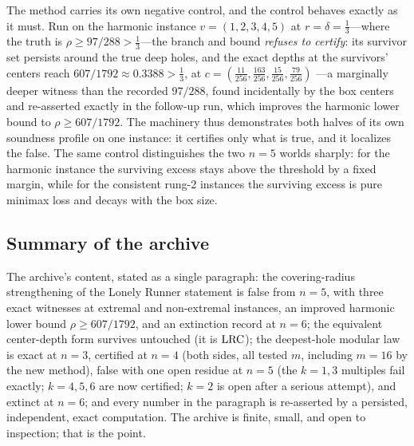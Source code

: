 The method carries its own negative control, and the control behaves
exactly as it must. Run on the harmonic instance $v=(1,2,3,4,5)$ at
$r=\delta=\tfrac13$---where the truth is $\rho\ge97/288>\tfrac13$---the
branch and bound \emph{refuses to certify}: its survivor set persists
around the true deep holes, and the exact depths at the survivors'
centers reach $607/1792\approx0.3388>\tfrac13$, at
$c=(\tfrac{11}{256},\tfrac{163}{256},\tfrac{15}{256},\tfrac{79}{256})$
---a marginally deeper witness than the recorded $97/288$, found
incidentally by the box centers and re-asserted exactly in the follow-up
run, which improves the harmonic lower bound to $\rho\ge607/1792$. The machinery thus demonstrates both halves of its own
soundness profile on one instance: it certifies only what is true, and
it localizes the false. The same control distinguishes the two
$n=5$ worlds sharply: for the harmonic instance the surviving excess
stays above the threshold by a fixed margin, while for the consistent
rung-2 instances the surviving excess is pure minimax loss and decays
with the box size.

\subsection{Summary of the archive}

The archive's content, stated as a single paragraph: the
covering-radius strengthening of the Lonely Runner statement is false
from $n=5$, with three exact witnesses at extremal and non-extremal
instances, an improved harmonic lower bound $\rho\ge607/1792$, and an
extinction record at $n=6$; the equivalent
center-depth form survives untouched (it is $\mathrm{LRC}$); the deepest-hole
modular law is exact at $n=3$, certified at $n=4$ (both sides, all
tested $m$, including $m=16$ by the new method), false with one open
residue at $n=5$ (the $k=1,3$ multiples fail exactly; $k=4,5,6$ are now
certified; $k=2$ is open after a serious attempt), and extinct at $n=6$; and every number in the paragraph is
re-asserted by a persisted, independent, exact computation. The archive
is finite, small, and open to inspection; that is the point.
